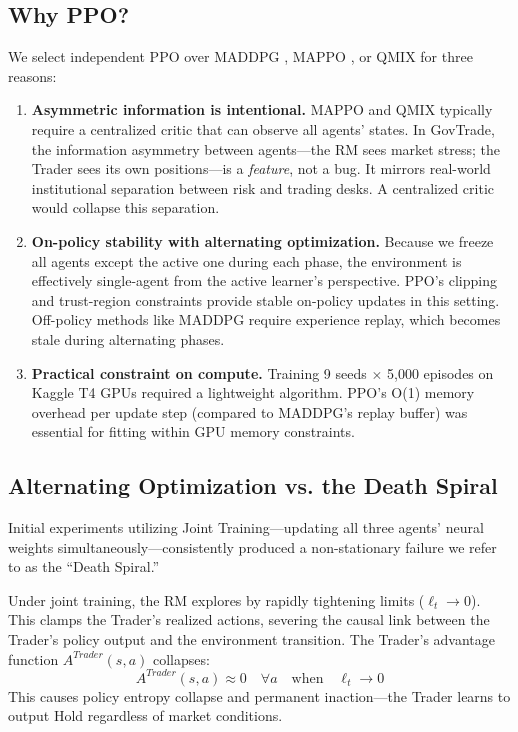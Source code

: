 \documentclass[11pt]{article}
\begin{document}
\subsection{Why PPO?}
\label{sec:ppo_choice}

We select independent PPO \cite{schulman2017proximal} over MADDPG \cite{lowe2017multi}, MAPPO \cite{yu2021mappo}, or QMIX \cite{rashid2018qmix} for three reasons:

\begin{enumerate}[leftmargin=*]
    \item \textbf{Asymmetric information is intentional.} MAPPO and QMIX typically require a centralized critic that can observe all agents' states. In GovTrade, the information asymmetry between agents---the RM sees market stress; the Trader sees its own positions---is a \emph{feature}, not a bug. It mirrors real-world institutional separation between risk and trading desks. A centralized critic would collapse this separation.
    \item \textbf{On-policy stability with alternating optimization.} Because we freeze all agents except the active one during each phase, the environment is effectively single-agent from the active learner's perspective. PPO's clipping and trust-region constraints provide stable on-policy updates in this setting. Off-policy methods like MADDPG require experience replay, which becomes stale during alternating phases.
    \item \textbf{Practical constraint on compute.} Training 9 seeds $\times$ 5{,}000 episodes on Kaggle T4 GPUs required a lightweight algorithm. PPO's O(1) memory overhead per update step (compared to MADDPG's replay buffer) was essential for fitting within GPU memory constraints.
\end{enumerate}

\subsection{Alternating Optimization vs. the Death Spiral}
\label{sec:death_spiral}
Initial experiments utilizing Joint Training---updating all three agents' neural weights simultaneously---consistently produced a non-stationary failure we refer to as the ``Death Spiral.''

Under joint training, the RM explores by rapidly tightening limits ($\ell_t \rightarrow 0$). This clamps the Trader's realized actions, severing the causal link between the Trader's policy output and the environment transition. The Trader's advantage function $A^{Trader}(s, a)$ collapses:
\begin{equation}
    A^{Trader}(s, a) \approx 0 \quad \forall a \quad \text{when} \quad \ell_t \rightarrow 0
\end{equation}
This causes policy entropy collapse and permanent inaction---the Trader learns to output Hold regardless of market conditions.
\end{document}
